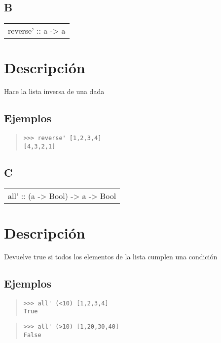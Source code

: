 \subsection{B}
\begin{haddockdesc}
\item[\begin{tabular}{@{}l}
reverse' :: {\char 91}a{\char 93} -> {\char 91}a{\char 93}
\end{tabular}]
{\haddockbegindoc
\section*{Descripción}
Hace la lista inversa de una dada\par
\subsection*{Ejemplos}
\begin{quote}
{\haddockverb\begin{verbatim}
>>> reverse' [1,2,3,4]
[4,3,2,1]

\end{verbatim}}
\end{quote}}
\end{haddockdesc}
\subsection{C}
\begin{haddockdesc}
\item[\begin{tabular}{@{}l}
all' :: (a -> Bool) -> {\char 91}a{\char 93} -> Bool
\end{tabular}]
{\haddockbegindoc
\section*{Descripción}
Devuelve true si todos los elementos de la lista cumplen una condición\par
\subsection*{Ejemplos}
\begin{quote}
{\haddockverb\begin{verbatim}
>>> all' (<10) [1,2,3,4]
True

\end{verbatim}}
\end{quote}
\begin{quote}
{\haddockverb\begin{verbatim}
>>> all' (>10) [1,20,30,40]
False

\end{verbatim}}
\end{quote}}
\end{haddockdesc}
